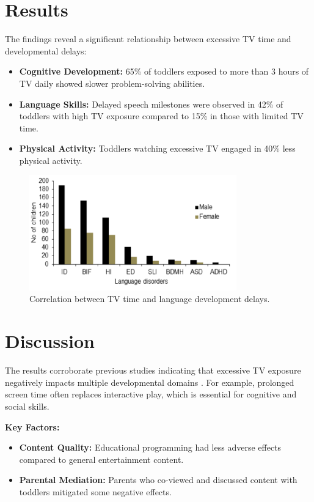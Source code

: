\documentclass[a4paper,12pt]{article}
\begin{document}
\section{Results}
The findings reveal a significant relationship between excessive TV time and developmental delays:
\begin{itemize}
    \item \textbf{Cognitive Development:} 65\% of toddlers exposed to more than 3 hours of TV daily showed slower problem-solving abilities.
    \item \textbf{Language Skills:} Delayed speech milestones were observed in 42\% of toddlers with high TV exposure compared to 15\% in those with limited TV time.
    \item \textbf{Physical Activity:} Toddlers watching excessive TV engaged in 40\% less physical activity.
\end{itemize}

\begin{figure}[h]
    \centering
    \includegraphics[width=0.8\textwidth]{example_graph.png}
    \caption{Correlation between TV time and language development delays.}
    \label{fig:language_delays}
\end{figure}

\section{Discussion}
The results corroborate previous studies indicating that excessive TV exposure negatively impacts multiple developmental domains \cite{previous_study}. For example, prolonged screen time often replaces interactive play, which is essential for cognitive and social skills.

\textbf{Key Factors:}
\begin{itemize}
    \item \textbf{Content Quality:} Educational programming had less adverse effects compared to general entertainment content.
    \item \textbf{Parental Mediation:} Parents who co-viewed and discussed content with toddlers mitigated some negative effects.
\end{itemize}
\end{document}
